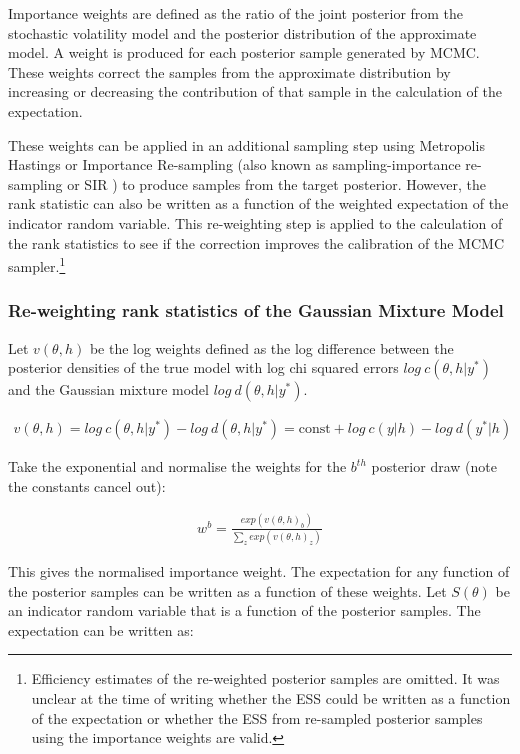 \documentclass[12pt, a4paper]{article}
\begin{document}
    Importance weights are defined as the ratio of the joint posterior from the stochastic volatility model and the posterior distribution of the approximate model. A weight is produced for each posterior sample generated by MCMC. These weights correct the samples from the approximate distribution by increasing or decreasing the contribution of that sample in the calculation of the expectation. 

    These weights can be applied in an additional sampling step using Metropolis Hastings or Importance Re-sampling (also known as sampling-importance re-sampling or SIR \citep{gelman2013bayesian}) to produce samples from the target posterior. However, the rank statistic can also be written as a function of the weighted expectation of the indicator random variable. This re-weighting step is applied to the calculation of the rank statistics to see if the correction improves the calibration of the MCMC sampler.\footnote{Efficiency estimates of the re-weighted posterior samples are omitted. It was unclear at the time of writing whether the ESS could be written as a function of the expectation or whether the ESS from re-sampled posterior samples using the importance weights are valid.}

    \subsubsection{Re-weighting rank statistics of the Gaussian Mixture Model}
    Let $v(\theta, h)$ be the log weights defined as the log difference between the posterior densities of the true model with log chi squared errors $log\: c(\theta, h | y^{\ast})$ and the Gaussian mixture model $log\:  d(\theta, h | y^{\ast})$.

    $$
    \begin{aligned}
        v(\theta, h) = log\: c(\theta, h | y^{\ast}) - log\:  d(\theta, h | y^{\ast}) = \text{const} + log\: c(y|h) - log\: d(y^{\ast} | h)
    \end{aligned}
    $$

    Take the exponential and normalise the weights for the $b^{th}$ posterior draw (note the constants cancel out):
    
    $$
    \begin{aligned}
    w^b = \frac{exp(v(\theta, h)_b)}{\sum_z exp(v(\theta, h)_z)}
    \end{aligned}
    $$

    This gives the normalised importance weight. The expectation for any function of the posterior samples can be written as a function of these weights. Let $S(\theta)$ be an indicator random variable that is a function of the posterior samples. The expectation can be written as:
\end{document}

